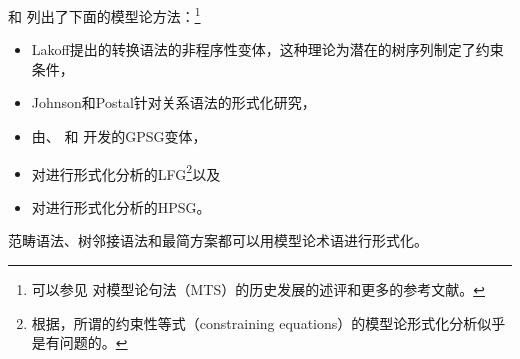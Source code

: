  \citet[--20]{PS2001a}和 \citet{Pullum2007a}列出了下面的模型论方法：\footnote{%
可以参见 对模型论句法（MTS）的历史发展的述评和更多的参考文献。  
}
\begin{itemize}
\item Lakoff提出的转换语法的非程序性变体，这种理论为潜在的树序列制定了约束条件，
\item Johnson和Postal针对关系语法的形式化研究\citeyearpar{JP80a-u}，
\item 由\citet{GPCKHL88a}、 \citet{BGM93a-u}和 \citet{Rogers97a}开发的GPSG变体\indexgpsgc，
\item  对\citet{Kaplan95a}进行形式化分析的LFG\indexlfgc \footnote{%
 根据\citet[\S~3.2]{Pullum2013a}，所谓的约束性等式（constraining equations）的模型论形式化分析似乎是有问题的。
}以及
\item  对\citet{King99a-u}进行形式化分析的HPSG\indexhpsgc 。
\end{itemize}
范畴语法\indexcgc\citep{BvN94a-u}、树邻接语法\indextagc\citep{RVS94a-u}和最简方案\indexmpc\citep{Veenstra98a}都可以用模型论术语进行形式化。

